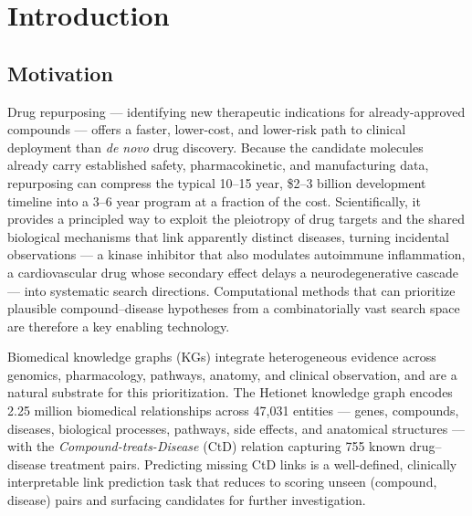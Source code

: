 \documentclass[twocolumn,10pt]{article}
\begin{document}
\section{Introduction}

\subsection{Motivation}

Drug repurposing --- identifying new therapeutic indications for already-approved compounds --- offers a faster, lower-cost, and lower-risk path to clinical deployment than \textit{de novo} drug discovery. Because the candidate molecules already carry established safety, pharmacokinetic, and manufacturing data, repurposing can compress the typical 10--15 year, \$2--3 billion development timeline into a 3--6 year program at a fraction of the cost. Scientifically, it provides a principled way to exploit the pleiotropy of drug targets and the shared biological mechanisms that link apparently distinct diseases, turning incidental observations --- a kinase inhibitor that also modulates autoimmune inflammation, a cardiovascular drug whose secondary effect delays a neurodegenerative cascade --- into systematic search directions. Computational methods that can prioritize plausible compound--disease hypotheses from a combinatorially vast search space are therefore a key enabling technology.

Biomedical knowledge graphs (KGs) integrate heterogeneous evidence across genomics, pharmacology, pathways, anatomy, and clinical observation, and are a natural substrate for this prioritization. The Hetionet knowledge graph \cite{himmelstein2017} encodes 2.25 million biomedical relationships across 47,031 entities --- genes, compounds, diseases, biological processes, pathways, side effects, and anatomical structures --- with the \textit{Compound-treats-Disease} (CtD) relation capturing 755 known drug--disease treatment pairs. Predicting missing CtD links is a well-defined, clinically interpretable link prediction task that reduces to scoring unseen (compound, disease) pairs and surfacing candidates for further investigation.
\end{document}
